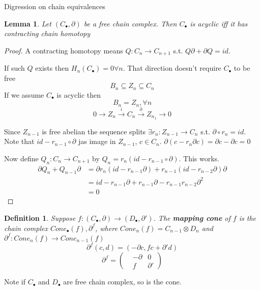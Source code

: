 \documentclass[11pt]{article}
\newtheorem{lemma}[thm]{Lemma}
\newtheorem{dfn}[thm]{Definition}
\newcommand{\pd}{\partial}
\newcommand{\lrta}{\longrightarrow}
\begin{document}
Digression on chain equivalences
\begin{lemma}
Let $(C_\bullet,\pd)$ be a free chain complex. Then $C_\bullet$ is acyclic iff it  has contracting chain homotopy
\end{lemma}
\begin{proof}
A contracting homotopy means $Q:C_n\lrta C_{n+1}$ s.t. $Q\pd+\pd Q=id$. 

If such $Q$ exists then $H_n(C_\bullet)=0\forall n$. That direction doesn't require $C_\bullet$ to be free
$$
B_n\subseteq Z_n\subseteq C_n
$$
If we assume $C_\bullet$ is acyclic then
$$
B_n=Z_n,\forall n
$$ 
$$
0\lrta Z_n \overset{i}{\lrta} C_n\overset{\pd}{\lrta}Z_{n_1}\lrta 0
$$

Since $Z_{n-1}$ is free abelian  the sequence splits $\exists r_n:Z_{n-1}\lrta C_n$ s.t. $\pd\circ r_n=id$. Note that $id- r_{n-1}\circ \pd$ jas image in $Z_{n-1}$, $c\in C_n$. $\pd(c-r_n\pd c)=\pd c-\pd c=0$

Now define 
$Q_n:C_n\lrta C_{n+1}$ by $Q_{n}=r_n (id-r_{n-1}\circ\pd)$. This works.
$$
\begin{aligned}
\pd Q_n +Q_{n-1}\pd
&=\pd r_n (id -r_{n-1}\pd)+r_{n-1}( id-r_{n-2}\pd )\pd\\
&=id -r_{n-1}\pd+r_{n-1}\pd -r_{n-1}r_{n-2}\pd^2\\
&=0
\end{aligned}
$$
\end{proof}
\begin{dfn}
Suppose $f:(C_\bullet,\pd)\lrta (D_\bullet,\pd')$. The \textbf{mapping cone } of $f$ is the chain complex $Cone_\bullet(f),\pd^f$, where $Cone_n(f)=C_{n-1}\otimes D_n$ and 
$\pd^f:Cone_n(f)\lrta Cone_{n-1}(f)$
$$
\pd^f(c,d)=(-\pd c,f c+\pd' d)
$$
$$
\pd^f=
\begin{pmatrix}
&-\pd & 0\\
& f &\pd'
\end{pmatrix}
$$
\end{dfn}

Note if $C_\bullet$ and $D_\bullet$ are free chain complex, so is the cone.
\end{document}
